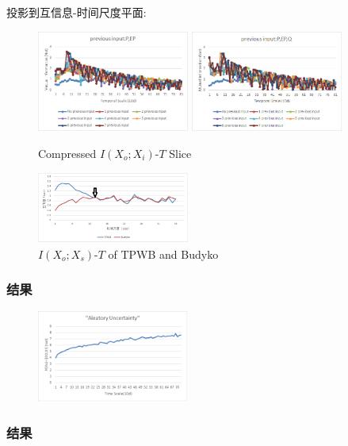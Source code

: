 \documentclass{beamer}
\begin{document}
\begin{CJK}{UTF8}{gkai}
\begin{frame}
\end{frame}

\begin{frame}
投影到互信息-时间尺度平面:
\begin{figure}[H]
\centering
\includegraphics[width=5cm]{ou.png}
\includegraphics[width=5cm]{ou2.png}
\caption{Compressed $I(X_o;X_i)$-$T$ Slice}
\end{figure}
\begin{figure}
\centering
\includegraphics[width=5cm]{TPWB_BUDYKO.png}
\caption{ $I(X_o;X_s)$-$T$ of TPWB and Budyko }
\end{figure}
\end{frame}

\begin{frame}

\frametitle{结果}
\begin{figure}[H]
\centering
\includegraphics[width=5cm]{au.png}
\end{figure}
 
\end{frame}

\begin{frame}

\frametitle{结果}
 


\end{frame}
\end{CJK}
\end{document}
